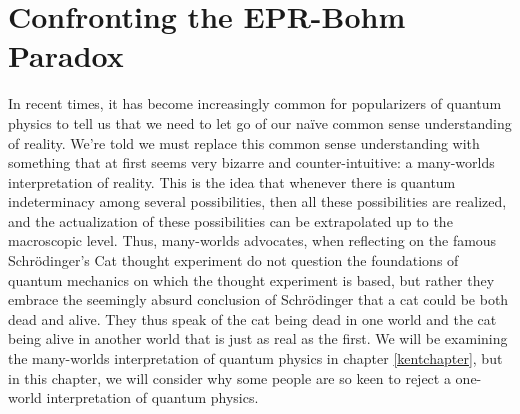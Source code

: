 \begin{comment}
    \section{Introduction}
    \emph{}
    
    Common sense is very often underrated. This is especially so in the light of modern physics. Not infrequently, one hears people claim that modern physics shows us that reality is fundamentally weird and that we must discard our naïve common sense intuitions. Now perhaps these people are right, but if we are to accept their claims, they ought to have really compelling reasons. The usual response to an argument that results in weird or seemingly absurd conclusions is to question the argument's premises or examine whether the argument is logically valid. 
\end{comment}
    \chapter{Confronting the EPR-Bohm Paradox\label{BellChapter}}
    In recent times, it has become increasingly common for popularizers of quantum physics to tell us that we need to let go of our naïve common sense understanding of reality. We're told we must replace this common sense understanding with something that at first seems very bizarre and counter-intuitive: a many-worlds interpretation of reality. This is the idea that whenever there is quantum indeterminacy among several possibilities, then all these possibilities are realized, and the actualization of these possibilities can be extrapolated up to the macroscopic level. Thus, many-worlds advocates, when reflecting on the famous Schr\"{o}dinger's Cat thought experiment do not question the foundations of quantum mechanics on which the thought experiment is based, but rather they embrace the seemingly absurd conclusion of Schr\"{o}dinger that a cat could be both dead and alive. They thus speak of the cat being dead in one world and the cat being alive in another world that is just as real as the first. We will be examining the many-worlds interpretation of quantum physics in chapter \ref{kentchapter}, but in this chapter, we will consider why some people are so keen to reject a one-world interpretation of quantum physics.
    
